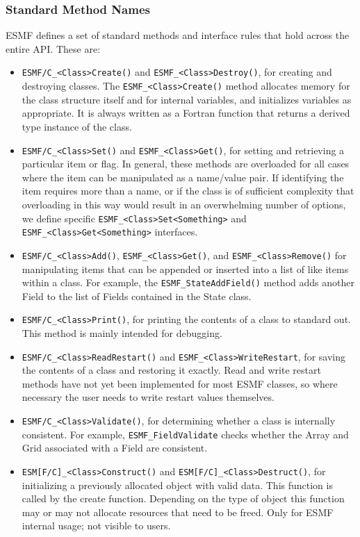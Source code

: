 \subsubsection{Standard Method Names}

ESMF defines a set of standard methods and interface rules that
hold across the entire API.  These are: 

\begin{itemize}

\item {\tt ESMF/C\_<Class>Create()} and {\tt ESMF\_<Class>Destroy()}, for creating and 
destroying classes.  The {\tt ESMF\_<Class>Create()} method allocates 
memory for the class structure itself and for internal variables, and
initializes variables as appropriate.  It is always written as a 
Fortran function that returns a derived type instance of the class.

\item {\tt ESMF/C\_<Class>Set()} and {\tt ESMF\_<Class>Get()}, for setting 
and retrieving a particular item or flag.  In general, these methods are
overloaded for all cases where the item can be manipulated as a
name/value pair.  If identifying the item requires more than a 
name, or if the class is of sufficient complexity that overloading
in this way would result in an overwhelming number of options, we 
define specific {\tt ESMF\_<Class>Set<Something>} and 
{\tt ESMF\_<Class>Get<Something>} interfaces.

\item {\tt ESMF/C\_<Class>Add()}, {\tt ESMF\_<Class>Get()}, and 
{\tt ESMF\_<Class>Remove()} for manipulating 
items that can be appended or inserted into a list of like
items within a class.  For example, the {\tt ESMF\_StateAddField()}
method adds another Field to the list of Fields contained
in the State class.

\item {\tt ESMF/C\_<Class>Print()}, for printing the contents of a class to 
standard out.  This method is mainly intended for debugging.

\item {\tt ESMF/C\_<Class>ReadRestart()} and {\tt ESMF\_<Class>WriteRestart}, 
for saving the contents of a class and restoring it exactly.  Read
and write restart methods have not yet been implemented for most
ESMF classes, so where necessary the user needs to write restart 
values themselves.

\item {\tt ESMF/C\_<Class>Validate()}, for determining whether a class is 
internally consistent.  For example, {\tt ESMF\_FieldValidate} checks 
whether the Array and Grid associated with a Field are consistent.
  
\item{\tt ESM[F/C]\_<Class>Construct()} and {\tt ESM[F/C]\_<Class>Destruct()},
for initializing a previously allocated object with valid data.  This 
function is called by the create function.  Depending on the type of 
object this function may or may not allocate resources that need to be freed.  
Only for ESMF internal usage; not visible to users.

\end{itemize}

